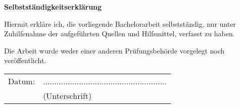 



\makeindex
{}


	\frontmatter

	
	
	\mainmatter
	
	\renewcommand{\baselinestretch}{1.05}
	\small\normalsize

	
	
	
	
	

	\appendix
	
	

	\backmatter
	


\newpage
\thispagestyle{empty}
\begin{center}
	\vspace*{5em}
	\huge\textbf{Selbstständigkeitserklärung}\\
\end{center}
\vspace{2em}
Hiermit erkläre ich, die vorliegende Bachelorarbeit selbstständig, nur unter Zuhilfenahme der aufgeführten Quellen und Hilfsmittel, verfasst zu haben.

Die Arbeit wurde weder einer anderen Prüfungsbehörde vorgelegt noch veröffentlicht.

\vspace{4em}
\begin{minipage}{\linewidth}
	\begin{tabular}{p{15em}p{15em}}
		Datum: &  .......................................................\\
		& \centering (Unterschrift)\\
	\end{tabular}
\end{minipage}



         
